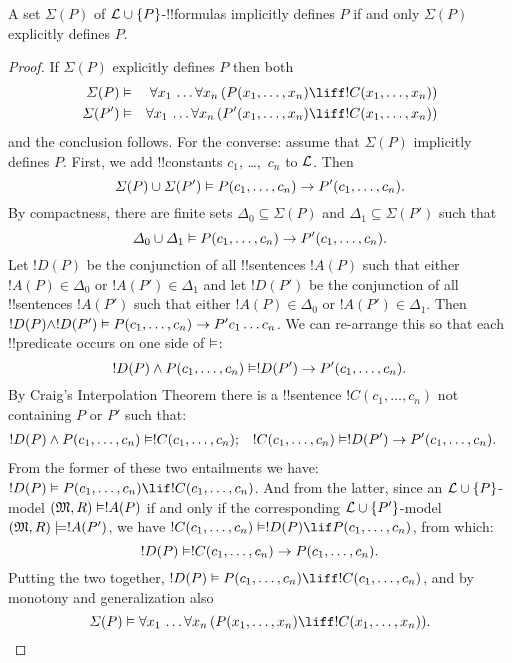 \documentclass[../../../include/open-logic-section]{subfiles}
\begin{document}
\begin{thm} A set $\Sigma(P)$ of $\Lang{L}
  \cup\{P\}$-!!{formula}s implicitly defines $P$ if and only $\Sigma(P)$
  explicitly defines $P$.
\end{thm}

\begin{proof}
If $\Sigma(P)$ explicitly defines $P$ then both
\begin{align*}
  \Sigma(P) & \Entails & \lforall[x_1][\dots \lforall[x_n]
    [(\Atom{P}{x_1,\dots, x_n} \liff !C(x_1,\dots,x_n))]]\\
  \Sigma(P') & \Entails & \lforall[x_1][\dots \lforall[x_n]
    [(\Atom{P'}{x_1,\dots, x_n} \liff !C(x_1,\dots,x_n))]]
\end{align*}
and the conclusion follows. For the converse: assume that $\Sigma(P)$
implicitly defines $P$. First, we add !!{constant}s $c_1$, \dots,~$c_n$ to
$\Lang{L}$. Then
\[
\Sigma(P) \cup \Sigma(P') \Entails
\Atom{P}{c_1, \dots, c_n} \to  \Atom{P'}{c_1, \dots, c_n}.
\]
By compactness, there are finite sets $\Delta_0 \subseteq \Sigma(P)$
and $\Delta_1 \subseteq \Sigma(P')$ such that
\[
\Delta_0 \cup \Delta_1 \Entails
\Atom{P}{c_1, \dots, c_n} \to \Atom{P'}{c_1, \dots, c_n}.
\]
Let $!D(P)$ be the conjunction of all !!{sentence}s $!A(P)$ such that
either $!A(P) \in \Delta_0$ or $!A(P') \in \Delta_1$ and let $!D(P')$
be the conjunction of all !!{sentence}s $!A(P')$ such that either
$!A(P) \in \Delta_0$ or $!A(P') \in \Delta_1$. Then $!D(P) \land
!D(P') \Entails \Atom{P}{c_1, \dots, c_n} \to P'c_1\dots c_n$. We can
re-arrange this so that each !!{predicate} occurs on one side of
$\Entails$:
\[
!D(P) \land \Atom{P}{c_1, \dots, c_n} \Entails
!D(P') \to \Atom{P'}{c_1, \dots, c_n}.
\]
By Craig's Interpolation Theorem there is a !!{sentence} $!C(c_1,\dots, c_n)$
not containing $P$ or $P'$ such that:
\begin{align*}
  !D(P) \land \Atom{P}{c_1, \dots, c_n} & \Entails !C(c_1,\dots, c_n); &
  !C(c_1,\dots, c_n) & \Entails !D(P') \to \Atom{P'}{c_1, \dots, c_n}.
\end{align*}
From the former of these two entailments we have: $!D(P) \Entails
\Atom{P}{c_1,\dots, c_n} \lif !C(c_1,\dots, c_n)$. And from the
latter, since an $\Lang{L} \cup \{P\}$-model $\Expan{M}{R}
\Entails !A(P)$ if and only if the corresponding $\Lang{L} \cup
\{P'\}$-model $\Expan{M}{R} \models !A(P')$, we have
$!C(c_1,\dots, c_n) \Entails !D(P) \lif \Atom{P}{c_1,\dots, c_n}$,
from which:
\[
!D(P) \Entails !C(c_1,\dots,c_n) \to \Atom{P}{c_1,\dots, c_n}.
\]
Putting the two together, $!D(P) \Entails \Atom{P}{c_1,\dots, c_n}
\liff !C(c_1, \dots, c_n)$, and by monotony and generalization also
\[
\Sigma(P) \Entails
\lforall[x_1][\dots\lforall[x_n][(\Atom{P}{x_1,\dots, x_n} \liff
    !C(x_1,\dots, x_n))]].
\]
\end{proof}
\end{document}
